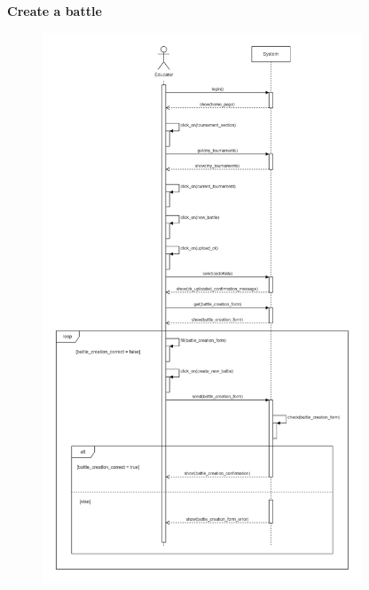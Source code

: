 \documentclass[../RASD.tex]{subfiles}
\begin{document}
    \textbf{Create a battle}
    \begin{figure}[h!]
        \centering
        \includegraphics[width=0.85\textwidth]{../assets/section_3/CreateABattle.png}
    \end{figure}
    \newpage
    \restoregeometry
\end{document}
